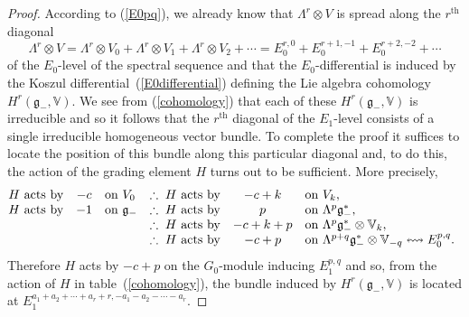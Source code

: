 \documentclass[pdftex]{sigma}
\begin{document}
\begin{proof} According to (\ref{E0pq}), we already know that
$\Lambda^r\otimes V$ is spread along the
$r^{\mathrm{th}}$ diagonal
\[\Lambda^r\otimes V=\Lambda^r\otimes V_0+\Lambda^r\otimes
V_1+\Lambda^r\otimes V_2+\cdots =
E_0^{r,0}+E_0^{r+1,-1}+E_0^{r+2,-2}+\cdots\]
of the $E_0$-level of the spectral sequence and that the $E_0$-dif\/ferential is
induced by the Koszul dif\/ferential~(\ref{E0differential}) def\/ining the Lie
algebra cohomology $H^r({\mathfrak{g}}_-,{\mathbb{V}})$. We see from
(\ref{cohomology}) that each of these $H^r({\mathfrak{g}}_-,{\mathbb{V}})$ is
irreducible and so it follows that the $r^{\mathrm{th}}$ diagonal of the
$E_1$-level consists of a single irreducible homogeneous vector bundle. To
complete the proof it suf\/f\/ices to locate the position of this bundle along this
particular diagonal and, to do this, the action of the grading element $H$
turns out to be suf\/f\/icient. More precisely,
\[\begin{array}{@{}rclrcl}
H\mbox{ acts by}&-c&\mbox{on }V_0&
\therefore\;H\mbox{ acts by}&-c+k&\mbox{on }V_k,\\
H\mbox{ acts by}&-1&\mbox{on }{\mathfrak{g}}_-&
\therefore\;H\mbox{ acts by}&p&\mbox{on }\Lambda^p{\mathfrak{g}}_-^*,\\
&&&\therefore\;H\mbox{ acts by}&-c+k+p&\mbox{on }
\Lambda^p{\mathfrak{g}}_-^*\otimes{\mathbb{V}}_k,\\
&&&\therefore\;H\mbox{ acts by}&-c+p&\mbox{on }
\Lambda^{p+q}{\mathfrak{g}}_-^*\otimes{\mathbb{V}}_{-q}\leftrightsquigarrow
E_0^{p,q}.
\end{array}\]
Therefore $H$ acts by $-c+p$ on the $G_0$-module inducing $E_1^{p,q}$ and so,
from the action of $H$ in table~(\ref{cohomology}), the bundle induced by
$H^r({\mathfrak{g}}_-,{\mathbb{V}})$ is located at
$E_1^{a_1+a_2+\cdots+a_r+r,-a_1-a_2-\cdots-a_r}$.


\end{proof}
\end{document}
